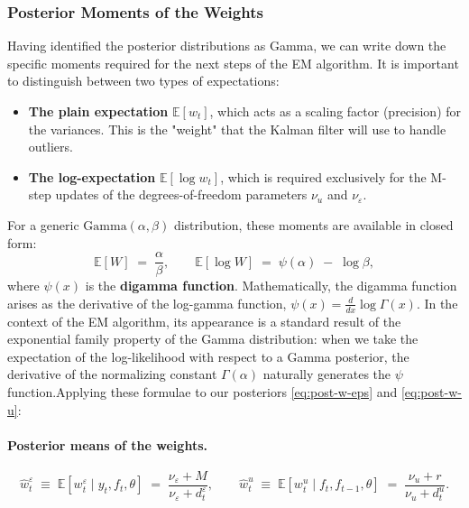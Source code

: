 \documentclass[11pt, a4paper, oneside]{article}
\begin{document}
\subsubsection{Posterior Moments of the Weights}
\label{subsubsec:weight-moments}
Having identified the posterior distributions as Gamma, we can write down the specific moments required for the next steps of the EM algorithm. It is important to distinguish between two types of expectations:\begin{itemize}[leftmargin=1.5em]\item \textbf{The plain expectation} $\mathbb{E}[w_t]$, which acts as a scaling factor (precision) for the variances. This is the "weight" that the Kalman filter will use to handle outliers.\item \textbf{The log-expectation} $\mathbb{E}[\log w_t]$, which is required exclusively for the M-step updates of the degrees-of-freedom parameters $\nu_u$ and $\nu_\varepsilon$.\end{itemize}For a generic $\mathrm{Gamma}(\alpha, \beta)$ distribution, these moments are available in closed form:$$\mathbb{E}[W] \;=\; \frac{\alpha}{\beta},
\qquad
\mathbb{E}[\log W] \;=\; \psi(\alpha) \;-\; \log \beta,$$where $\psi(x)$ is the \textbf{digamma function}. Mathematically, the digamma function arises as the derivative of the log-gamma function, $\psi(x) = \frac{d}{dx}\log \Gamma(x)$. In the context of the EM algorithm, its appearance is a standard result of the exponential family property of the Gamma distribution: when we take the expectation of the log-likelihood with respect to a Gamma posterior, the derivative of the normalizing constant $\Gamma(\alpha)$ naturally generates the $\psi$ function.Applying these formulae to our posteriors \eqref{eq:post-w-eps} and \eqref{eq:post-w-u}:

\paragraph{Posterior means of the weights.}
\begin{equation}
\boxed{\;\;
\hat{w}^\varepsilon_t \;\equiv\; \mathbb{E}[w^\varepsilon_t \mid y_t, f_t, \theta] \;=\;
\frac{\nu_\varepsilon + M}{\nu_\varepsilon + d^\varepsilon_t},
\qquad
\hat{w}^u_t \;\equiv\; \mathbb{E}[w^u_t \mid f_t, f_{t-1}, \theta] \;=\;
\frac{\nu_u + r}{\nu_u + d^u_t}.
\;\;}
\label{eq:w-hat}
\end{equation}
\end{document}
